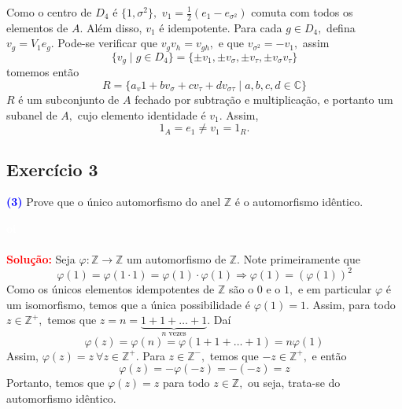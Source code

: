 \documentclass[11pt,a4paper]{article}
\newcommand{\exercicio}[1]{\subsection{Exercício #1} \textcolor{blue}{\bf(#1)}}
\newcommand{\solucao}[1]{
\textbf{\textcolor{white}{oi}\\ \\ \textcolor{red}{Solução:}} #1}
\begin{document}
{\noindent
Como o centro de $D_4$ é $\{1, \sigma^2 \},$ $v_1 = \frac{1}{2}(e_1 - e_{\sigma^2})$ comuta com todos os elementos de $A.$ Além disso, $v_1$ é idempotente. Para cada $g \in D_4,$ defina $v_g = V_1 e_g.$ Pode-se verificar que $v_g v_h = v_{gh},$ e que $v_{\sigma^2} = -v_1,$ assim
\[
\{ v_g \mid g \in D_4 \} = \{\pm v_1, \pm v_\sigma, \pm v_\tau, \pm v_\sigma v_\tau \}
\]
tomemos então
\[
R = \{ a_v1 + bv_\sigma + cv_\tau + d v_{\sigma \tau} \mid a,b,c,d \in \mathbb{C} \}
\]
$R$ é um subconjunto de $A$ fechado por subtração e multiplicação, e portanto um subanel de $A,$ cujo elemento identidade é $v_1.$ Assim,
\[
1_A = e_1 \neq v_1 = 1_R.
\]
}

\exercicio{3} Prove que o único automorfismo do anel $\mathbb{Z}$ é o automorfismo idêntico.
\solucao{
Seja $\varphi \colon \mathbb{Z} \to \mathbb{Z}$ um automorfismo de $\mathbb{Z}.$ Note primeiramente que
\[
\varphi(1) = \varphi(1 \cdot 1) = \varphi(1) \cdot \varphi(1) \Rightarrow \varphi(1) = (\varphi(1))^2
\]
Como os únicos elementos idempotentes de $\mathbb{Z}$ são o $0$ e o $1,$ e em particular $\varphi$ é um isomorfismo, temos que a única possibilidade é $\varphi(1) = 1.$ Assim, para todo $z \in \mathbb{Z}^{+},$ temos que $z = n = \underbrace{1 + 1 + \ldots + 1}_{n \mbox{ vezes}}.$ Daí
\[
\varphi(z) = \varphi(n) = \varphi(1 + 1 + \ldots + 1) = n \varphi(1)
\]
Assim, $\varphi(z) = z \ \forall z \in \mathbb{Z}^{+}.$ Para $z \in \mathbb{Z}^{-},$ temos que $-z \in \mathbb{Z}^{+},$ e então
\[
\varphi(z) = -\varphi(-z) = -(-z) = z
\]
Portanto, temos que $\varphi(z) = z$ para todo $z \in \mathbb{Z},$ ou seja, trata-se do automorfismo idêntico.
}
\end{document}
